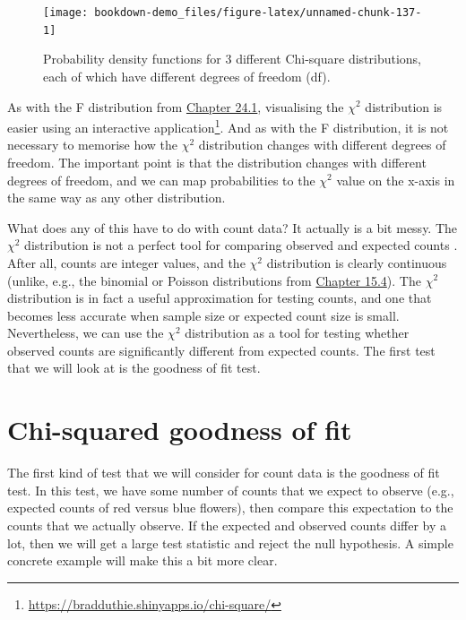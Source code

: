 \documentclass[
]{scrbook}
\begin{document}
\begin{figure}
\texttt{[image: bookdown-demo\_files/figure-latex/unnamed-chunk-137-1]} \caption{Probability density functions for 3 different Chi-square distributions, each of which have different degrees of freedom (df).}\label{fig:unnamed-chunk-137}
\end{figure}

As with the F distribution from \protect\hyperlink{the-f-distribution}{Chapter 24.1}, visualising the \(\chi^{2}\) distribution is easier using an interactive application\footnote{\url{https://bradduthie.shinyapps.io/chi-square/}}.
And as with the F distribution, it is not necessary to memorise how the \(\chi^{2}\) distribution changes with different degrees of freedom.
The important point is that the distribution changes with different degrees of freedom, and we can map probabilities to the \(\chi^{2}\) value on the x-axis in the same way as any other distribution.

What does any of this have to do with count data? It actually is a bit messy.
The \(\chi^{2}\) distribution is not a perfect tool for comparing observed and expected counts \citep{Sokal1995}.
After all, counts are integer values, and the \(\chi^{2}\) distribution is clearly continuous (unlike, e.g., the binomial or Poisson distributions from \protect\hyperlink{ux5cux23probability-distributions}{Chapter 15.4}).
The \(\chi^{2}\) distribution is in fact a useful approximation for testing counts, and one that becomes less accurate when sample size \citep{Slakter1968} or expected count size \citep{Tate1973} is small.
Nevertheless, we can use the \(\chi^{2}\) distribution as a tool for testing whether observed counts are significantly different from expected counts.
The first test that we will look at is the goodness of fit test.

\hypertarget{chi-squared-goodness-of-fit}{%
\section{Chi-squared goodness of fit}\label{chi-squared-goodness-of-fit}}

The first kind of test that we will consider for count data is the goodness of fit test.
In this test, we have some number of counts that we expect to observe (e.g., expected counts of red versus blue flowers), then compare this expectation to the counts that we actually observe.
If the expected and observed counts differ by a lot, then we will get a large test statistic and reject the null hypothesis.
A simple concrete example will make this a bit more clear.
\end{document}
